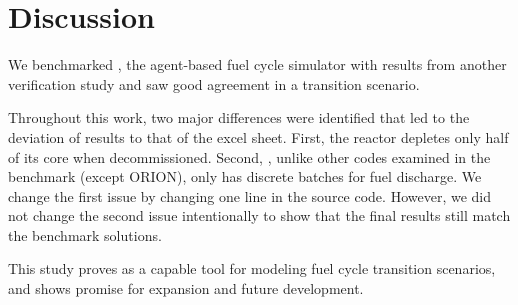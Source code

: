 \section{Discussion}

We benchmarked \Cyclus, the agent-based
fuel cycle simulator with results from another
verification study and saw good agreement
in a transition scenario.

Throughout this work, two major differences were identified
that led to the deviation
of \Cyclus results to that of the excel sheet. First,
the \Cycamore reactor depletes only half of its core
when decommissioned. Second, \Cyclus, unlike other
codes examined in the benchmark (except ORION), only has
discrete batches for fuel discharge.
We change the first issue by changing one line in the source code.
However, we did not change the
second issue intentionally to show that the final results
still match the benchmark solutions.

This study proves \Cyclus as a capable tool for modeling
fuel cycle transition scenarios, and shows promise for
expansion and future development.